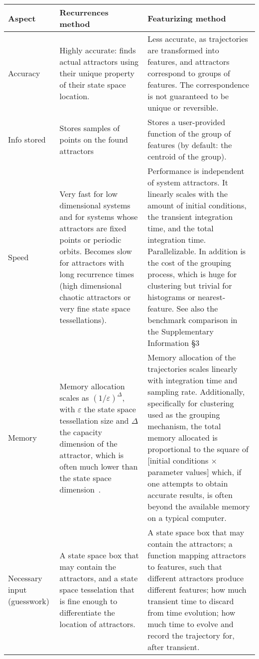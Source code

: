 \documentclass[9pt,twocolumn,twoside,lineno]{pnas-new}
\begin{document}
 \begin{table*}[!t]
     \centering
     \begin{tabular}{p{1.5cm}p{7.5cm}p{7.5cm}}\toprule
     \textbf{Aspect} & \textbf{Recurrences method} & \textbf{Featurizing method} \\ \hline
     
     Accuracy & Highly accurate: finds actual attractors using their unique property of their state space location. & 
     Less accurate, as trajectories are transformed into features, and attractors correspond to groups of features. The correspondence is not guaranteed to be unique or reversible. \\ 
     
     Info stored & Stores samples of points on the found attractors & Stores a user-provided function of the group of features (by default: the centroid of the group). \\
     
     Speed & Very fast for low dimensional systems and for systems whose attractors are fixed points or periodic orbits. Becomes slow for attractors with long recurrence times (high dimensional chaotic attractors or very fine state space tessellations). & Performance is independent of system attractors. It linearly scales with the amount of initial conditions, the transient integration time, and the total integration time. Parallelizable. In addition is the cost of the grouping process, which is huge for clustering but trivial for histograms or nearest-feature. See also the benchmark comparison in the Supplementary Information \S 3 \\ 
     
     Memory & Memory allocation scales as $(1/\varepsilon)^\Delta$, with $\varepsilon$ the state space tessellation size and $\Delta$ the capacity dimension of the attractor, which is often much lower than the state space dimension~\cite{DatserisBook}. & Memory allocation of the trajectories scales linearly with integration time and sampling rate. Additionally, specifically for clustering used as the grouping mechanism, the total memory allocated is proportional to the square of [initial conditions $\times$ parameter values] which, if one attempts to obtain accurate results, is often beyond the available memory on a typical computer.\\
     
     Necessary input (guesswork) & A state space box that may contain the attractors, and a state space tesselation that is fine enough to differentiate the location of attractors. & A state space box that may contain the attractors; a function mapping attractors to features, such that different attractors produce different features; how much transient time to discard from time evolution; how much time to evolve and record the trajectory for, after transient. \\
     

\end{tabular}
\end{table*}
\end{document}

